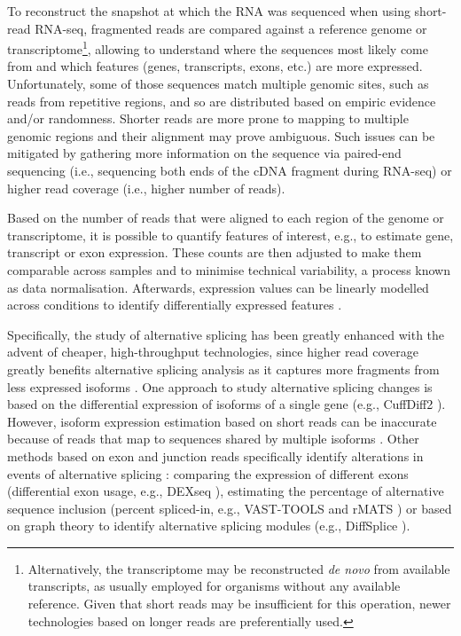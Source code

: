 To reconstruct the snapshot at which the RNA was sequenced when using short-read RNA-seq, fragmented reads are compared against a reference genome or transcriptome\footnote{Alternatively, the transcriptome may be reconstructed \emph{de novo} from available transcripts, as usually employed for organisms without any available reference. Given that short reads may be insufficient for this operation, newer technologies based on longer reads are preferentially used.}, allowing to understand where the sequences most likely come from and which features (genes, transcripts, exons, etc.) are more expressed. Unfortunately, some of those sequences match multiple genomic sites, such as reads from repetitive regions, and so are distributed based on empiric evidence and/or randomness. Shorter reads are more prone to mapping to multiple genomic regions and their alignment may prove ambiguous. Such issues can be mitigated by gathering more information on the sequence via paired-end sequencing (i.e., sequencing both ends of the cDNA fragment during RNA-seq) or higher read coverage (i.e., higher number of reads).

Based on the number of reads that were aligned to each region of the genome or transcriptome, it is possible to quantify features of interest, e.g., to estimate gene, transcript or exon expression. %
These counts are then adjusted to make them comparable across samples and to minimise technical variability, a process known as data normalisation. Afterwards, expression values can be linearly modelled across conditions to identify differentially expressed features \cite{conesa:2016vw}.

Specifically, the study of alternative splicing has been greatly enhanced with the advent of cheaper, high-throughput technologies, since higher read coverage greatly benefits alternative splicing analysis as it captures more fragments from less expressed isoforms \cite{conesa:2016vw}.
One approach to study alternative splicing changes is based on the differential expression of isoforms of a single gene (e.g., CuffDiff2 \cite{trapnell:2013uv}). However, isoform expression estimation based on short reads can be inaccurate because of reads that map to sequences shared by multiple isoforms \cite{conesa:2016vw}.
Other methods based on exon and junction reads specifically identify alterations in events of alternative splicing \cite{conesa:2016vw}: comparing the expression of different exons (differential exon usage, e.g., DEXseq \cite{li:2015tn}), estimating the percentage of alternative sequence inclusion (percent spliced-in, e.g., VAST-TOOLS \cite{irimia:2014wt,tapial:2017ui} and rMATS \cite{shen:2014tk}) or based on graph theory to identify alternative splicing modules (e.g., DiffSplice \cite{hu:2012uw}).

